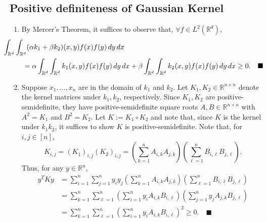 \documentclass[11pt]{article}
\renewcommand{\qed}{\quad \ensuremath{\blacksquare}}
\newcommand{\R}{\mathbb{R}} %
\begin{document}
\subsection{Positive definiteness of Gaussian Kernel}
\begin{enumerate}
\item By Mercer's Theorem, it suffices to observe that,
$\forall f \in L^2(\R^d)$,
\begin{align*}
&\hspace{-10mm}
\int_{\R^d} \int_{\R^d} (\alpha k_1 + \beta k_2)(x,y) f(x) f(y) \, dy \, dx\\
 &  = \alpha \int_{\R^d} \int_{\R^d} k_1(x,y) f(x) f(y) \, dy \, dx
    + \beta \int_{\R^d} \int_{\R^d} k_2(x,y) f(x) f(y) \, dy \, dx
    \geq 0. \qed
\end{align*}
\item Suppose $x_1,\dots,x_n$ are in the domain of $k_1$ and $k_2$. Let
$K_1,K_2 \in \R^{n \times n}$ denote the kernel matrices under $k_1,k_2$,
respectively. Since $K_1,K_2$ are positive-semidefinite, they have
positive-semidefinite square roots $A,B \in \R^{n \times n}$ with $A^2 = K_1$
and $B^2 = K_2$. Let $K := K_1 \circ K_2$ and note that, since $K$ is the
kernel under $k_1k_2$, it suffices to show $K$ is positive-semidefinite. Note
that, for $i,j \in [n]$,
\[K_{i,j}
    = (K_1)_{i,j}(K_2)_{i,j}
    = \left( \sum_{k = 1}^n A_{i,k}A_{j,k} \right)
    \left( \sum_{\ell = 1}^n B_{i,\ell}B_{j,\ell} \right).
\]
Thus, for any $y \in \R^n$,
\begin{align*}
y^TKy
 &  = \sum_{i = 1}^n \sum_{j = 1}^n y_iy_j
    \left( \sum_{k = 1}^n A_{i,k}A_{j,k} \right)
    \left( \sum_{\ell = 1}^n B_{i,\ell}B_{j,\ell} \right)   \\
 &  = \sum_{k = 1}^n \sum_{\ell = 1}^n
    \left( \sum_{i = 1}^n y_iA_{i,k}B_{i,\ell} \right)
    \left( \sum_{j = 1}^n y_jA_{j,k}B_{j,\ell} \right)  \\
 &  = \sum_{k = 1}^n \sum_{\ell = 1}^n
    \left( \sum_{i = 1}^n y_iA_{i,k}B_{i,\ell} \right)^2
    \geq 0. \qed
\end{align*}


\end{enumerate}
\end{document}
